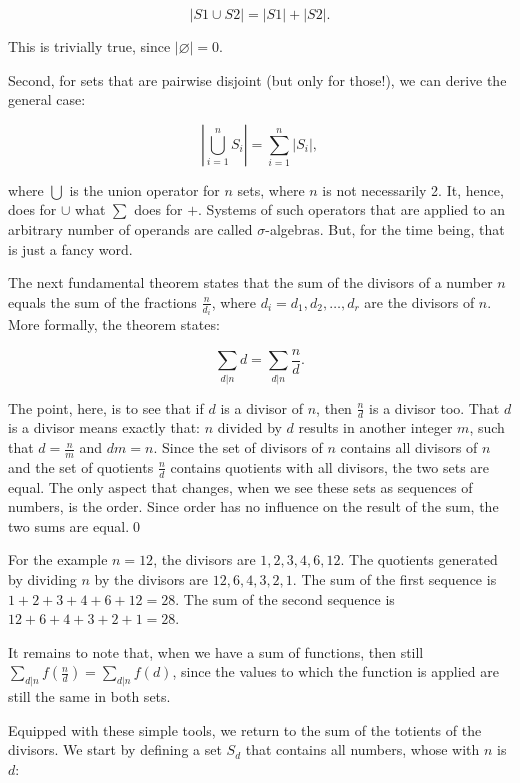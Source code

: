 \documentclass[tikz]{scrreprt}
\newcommand{\texfamily}{\fontfamily{cmtex}\selectfont}
\begin{document}
\begin{equation}
|S1 \cup S2| = |S1| + |S2|. 
\end{equation}

This is trivially true, since $|\varnothing| = 0$.

Second, for sets that are pairwise disjoint
(but only for those!), we can derive the
general case:

\begin{equation}\label{eq:CardinalUnion}
\left|\bigcup_{i=1}^n{S_i}\right| = \sum_{i=1}^n{|S_i|}, 
\end{equation}

where $\bigcup$ is the union operator for $n$ sets,
where $n$ is not necessarily 2.
It, hence, does for $\cup$ what $\sum$ does for $+$.
Systems of such operators that are applied to 
an arbitrary number of operands are called
$\sigma$-algebras. But, for the time being,
that is just a fancy word.

The next fundamental theorem states
that the sum of the divisors of a number $n$
equals the sum of the fractions $\frac{n}{d_i}$,
where $d_i = d_1,d_2,\dots,d_r$ are the divisors of $n$.
More formally, the theorem states:

\begin{equation}\label{eq:SumOfDiv}
\sum_{d|n}{d} = \sum_{d|n}{\frac{n}{d}}.
\end{equation}

The point, here, is to see that if $d$ is a divisor of $n$,
then $\frac{n}{d}$ is a divisor too. That $d$ is a divisor
means exactly that: $n$ divided by $d$ results in another
integer $m$, such that $d = \frac{n}{m}$ and $dm=n$.
Since the set of divisors of $n$ contains all divisors
of $n$ and the set of quotients $\frac{n}{d}$ contains
quotients with all divisors, the two sets are equal.
The only aspect that changes, when we see these sets
as sequences of numbers, is the order.
Since order has no influence on the result
of the sum, the two sums are equal.\qed

For the example $n=12$, the divisors are
$1,2,3,4,6,12$. The quotients generated by
dividing $n$ by the divisors are
$12,6,4,3,2,1$.
The sum of the first sequence is $1+2+3+4+6+12 = 28$.
The sum of the second sequence is $12+6+4+3+2+1 = 28$.

It remains to note that, when we have a sum
of functions, then still 
$\sum_{d|n}{f(\frac{n}{d})} = \sum_{d|n}{f(d)}$,
since the values to which the function is applied
are still the same in both sets.

Equipped with these simple tools, we return
to the sum of the totients of the divisors.
We start by defining a set $S_d$ that contains
all numbers, whose \text{\texfamily gcd} with $n$ is $d$:
\end{document}
